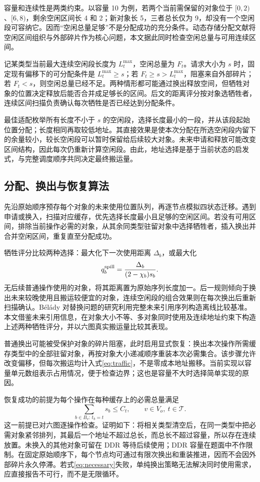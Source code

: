 容量和连续性是两类约束。以容量 10 为例，若两个当前需保留的对象位于 $[0,2)$、$[6,8)$，剩余空闲区间长 4 和 2；新对象长 5，三者总长仅为 9，却没有一个空闲段可容纳它。因而“空闲总量足够”不是分配成功的充分条件。动态存储分配文献将空闲区间组织与外部碎片作为核心问题\cite{wilson}，本文据此同时检查空闲总量与可用连续区间。

记某类型当前最大连续空闲段长度为 $L_t^{\max}$，空闲总量为 $F_t$。请求大小为 $s$ 时，固定现有偏移下的可分配条件是 $L_t^{\max}\ge s$；若 $F_t\ge s>L_t^{\max}$，阻塞来自外部碎片；若 $F_t<s$，则空闲总量已经不足。两种情形都可能通过换出释放空间，但牺牲对象的位置决定释放后能否合并成足够长的区间。后文的距离评分按对象选牺牲者，连续区间扫描负责确认每次牺牲是否已经达到分配条件。

最佳适配枚举所有长度不小于 $s$ 的空闲段，选择长度最小的一段，并从该段起始位置分配；长度相同再取较低地址。其直接效果是使本次分配在所选空闲段内留下的余量较小，较长空闲段可以暂时保留给后续较大对象。未来申请和释放可能改变区间结构，因此每次仍重新计算空闲段。由此，地址选择是基于当前状态的启发式，与完整调度顺序共同决定最终搬运量。

\subsection{分配、换出与恢复算法}
先沿原始顺序预存每个对象的未来使用位置队列，再逐节点模拟四状态迁移。遇到申请或换入，扫描对应缓存，优先选择长度最小且足够的空闲区间。若没有可用区间，排除当前操作必需的对象，从其余同类型驻留对象中选择牺牲者，插入换出并合并空闲区间，重复直至分配成功。

牺牲评分比较两种选择：最大化下一次使用距离 $\Delta_b$，或最大化
\begin{equation}
q_b^{\rm spill}=\frac{\Delta_b}{(2-\chi_b)s_b}.\label{eq:victim}
\end{equation}
无后续普通操作使用的对象，将其距离置为原始序列长度加一。后一规则倾向于换出未来较晚使用且搬运较便宜的对象，连续空闲段的组合效果则在每次换出后重新扫描确认。Bélády 对替换问题的研究利用完整未来引用序列构造离线比较基准\cite{belady}。本文借鉴未来引用信息，在对象大小不等、多对象同时使用及连续地址约束下构造上述两种牺牲评分，并以六图真实搬运量比较其表现。

普通换出可能被受保护对象的碎片阻塞，此时启用显式恢复：换出本次操作所需缓存类型中的全部驻留对象，再按对象大小递减顺序重装本次必需集合。该步骤允许改变偏移，但每次搬运均计入式\eqref{eq:traffic}，不是零成本地址搬移。当前实现以容量单元数组表示占用情况，便于检查边界；这也是容量不大时选择简单实现的原因。

恢复成功的前提为每个操作在每种缓存上的必需总量满足
\begin{equation}
\sum_{b\in B_v:\,t_b=t}s_b\le C_t,\qquad v\in V_o,\ t\in\mathcal T.\label{eq:necessary}
\end{equation}
这一前提已对六图逐操作检查。证明如下：将相关类型清空后，在同一类型中把必需对象紧邻排列，其最后一个地址不超过总长，而总长不超过容量，所以存在连续放置。未换入的其他对象可留在 DDR 等待后续使用；DDR 容量在题面中不作限制。在固定原始顺序下，每个节点均可通过有限次换出和重装推进，因而不会因外部碎片永久停滞。若式\eqref{eq:necessary}失败，单纯换出策略无法解决同时使用需求，应直接报告不可行，而不是无限循环。

